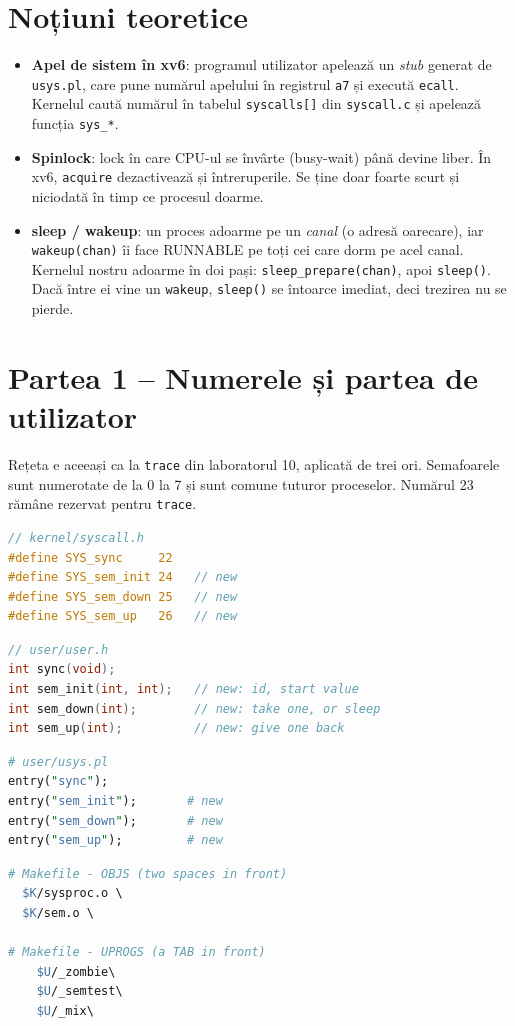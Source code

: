 \documentclass[11pt,a4paper]{article}
\begin{document}
\section*{Noțiuni teoretice}
\begin{itemize}[leftmargin=*]
  \item \textbf{Apel de sistem în xv6}: programul utilizator apelează un \emph{stub} generat de \texttt{usys.pl}, care
        pune numărul apelului în registrul \texttt{a7} și execută \texttt{ecall}. Kernelul caută numărul în tabelul
        \texttt{syscalls[]} din \texttt{syscall.c} și apelează funcția \texttt{sys\_*}.
  \item \textbf{Spinlock}: lock în care CPU-ul se învârte (busy-wait) până devine liber. În xv6, \texttt{acquire}
        dezactivează și întreruperile. Se ține doar foarte scurt și niciodată în timp ce procesul doarme.
  \item \textbf{sleep / wakeup}: un proces adoarme pe un \emph{canal} (o adresă oarecare), iar \texttt{wakeup(chan)}
        îi face RUNNABLE pe toți cei care dorm pe acel canal. Kernelul nostru adoarme în doi pași:
        \texttt{sleep\_prepare(chan)}, apoi \texttt{sleep()}. Dacă între ei vine un \texttt{wakeup},
        \texttt{sleep()} se întoarce imediat, deci trezirea nu se pierde.
\end{itemize}

\section{Partea 1 -- Numerele și partea de utilizator}
Rețeta e aceeași ca la \texttt{trace} din laboratorul 10, aplicată de trei ori. Semafoarele sunt numerotate de la 0 la 7
și sunt comune tuturor proceselor. Numărul 23 rămâne rezervat pentru \texttt{trace}.

\begin{lstlisting}[language=C,title={\texttt{snippets/syscall.h}}]
// kernel/syscall.h
#define SYS_sync     22
#define SYS_sem_init 24   // new
#define SYS_sem_down 25   // new
#define SYS_sem_up   26   // new
\end{lstlisting}
\begin{lstlisting}[language=C,title={\texttt{snippets/user.h}}]
// user/user.h
int sync(void);
int sem_init(int, int);   // new: id, start value
int sem_down(int);        // new: take one, or sleep
int sem_up(int);          // new: give one back
\end{lstlisting}
\begin{lstlisting}[language=Perl,title={\texttt{snippets/usys.pl}}]
# user/usys.pl
entry("sync");
entry("sem_init");       # new
entry("sem_down");       # new
entry("sem_up");         # new
\end{lstlisting}
\begin{lstlisting}[language=make,title={\texttt{snippets/Makefile}}]
# Makefile - OBJS (two spaces in front)
  $K/sysproc.o \
  $K/sem.o \

# Makefile - UPROGS (a TAB in front)
	$U/_zombie\
	$U/_semtest\
	$U/_mix\
\end{lstlisting}
\end{document}
